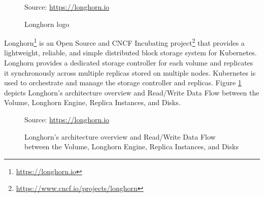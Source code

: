 \begin{figure} %
  \centering
  \def\stackalignment{r} %
  {\scriptsize \parbox[t]{\linewidth}{ Source: \url{https://longhorn.io}} }
  \caption{Longhorn logo}
\end{figure}

Longhorn\footnote{\url{https://longhorn.io}} is an Open Source and CNCF
Incubating project\footnote{\url{https://www.cncf.io/projects/longhorn}} that
provides a lightweight, reliable, and simple distributed block storage system
for Kubernetes. Longhorn provides a dedicated storage controller for each volume
and replicates it synchronously across multiple replicas stored on multiple nodes.
Kubernetes is used to orchestrate and manage the storage controller and replicas.
Figure \ref{fig:longhorn} depicts Longhorn's architecture overview and Read/Write
Data Flow between the Volume, Longhorn Engine, Replica Instances, and Disks.

\begin{figure}[htbp]
  \centering
  \vspace{.5em}
  \def\stackalignment{r} %
  {\scriptsize Source: \url{https://longhorn.io} }
  \caption{Longhorn's
  architecture
  overview
  and
  Read/Write
  Data
  Flow
  between
  the
  Volume,
  Longhorn
  Engine,
  Replica
  Instances,
  and
  Disks}
  \label{fig:longhorn}
\end{figure}

